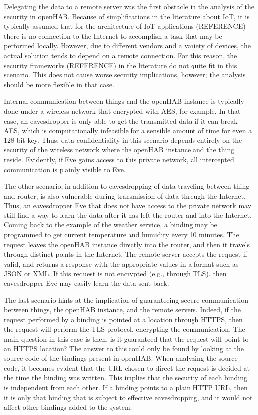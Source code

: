 \documentclass[12pt]{article}
\begin{document}
Delegating the data to a remote server was the first obstacle in the analysis of the security in openHAB. Because of simplifications in the literature about IoT, it is typically assumed that for the architecture of IoT applications (REFERENCE) there is no connection to the Internet to accomplish a task that may be performed locally. However, due to different vendors and a variety of devices, the actual solution tends to depend on a remote connection. For this reason, the security frameworks (REFERENCE) in the literature do not quite fit in this scenario. This does not cause worse security implications, however; the analysis should be more flexible in that case.

Internal communication between things and the openHAB instance is typically done under a wireless network that encrypted with AES, for example. In that case, an eavesdropper is only able to get the transmitted data if it can break AES, which is computationally infeasible for a sensible amount of time for even a 128-bit key. Thus, data confidentiality in this scenario depends entirely on the security of the wireless network where the openHAB instance and the thing reside. Evidently, if Eve gains access to this private network, all intercepted communication is plainly visible to Eve.

The other scenario, in addition to eavesdropping of data traveling between thing and router, is also vulnerable during transmission of data through the Internet. Thus, an eavesdropper Eve that does not have access to the private network may still find a way to learn the data after it has left the router and into the Internet. Coming back to the example of the weather service, a binding may be programmed to get current temperature and humidity every 10 minutes. The request leaves the openHAB instance directly into the router, and then it travels through distinct points in the Internet. The remote server accepts the request if valid, and returns a response with the appropriate values in a format such as JSON or XML. If this request is not encrypted (e.g., through TLS), then eavesdropper Eve may easily learn the data sent back.

The last scenario hints at the implication of guaranteeing secure communication between things, the openHAB instance, and the remote servers. Indeed, if the request performed by a binding is pointed at a location through HTTPS, then the request will perform the TLS protocol, encrypting the communication. The main question in this case is then, is it guaranteed that the request will point to an HTTPS location? The answer to this could only be found by looking at the source code of the bindings present in openHAB. When analyzing the source code, it becomes evident that the URL chosen to direct the request is decided at the time the binding was written. This implies that the security of each binding is independent from each other. If a binding points to a plain HTTP URL, then it is only that binding that is subject to effective eavesdropping, and it would not affect other bindings added to the system.
\end{document}
